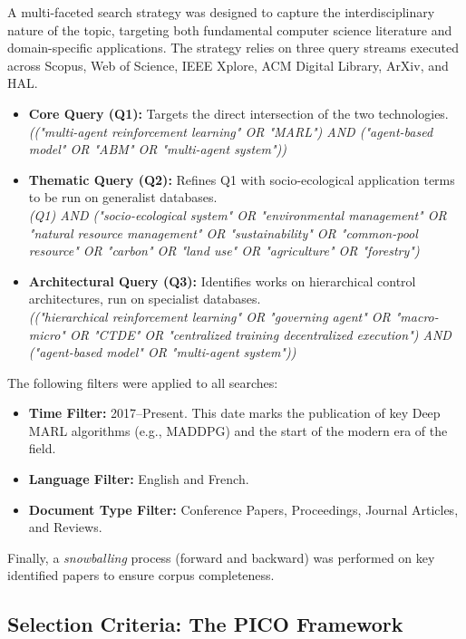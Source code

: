\documentclass[conference]{IEEEtran}
\begin{document}
A multi-faceted search strategy was designed to capture the interdisciplinary nature of the topic, targeting both fundamental computer science literature and domain-specific applications. The strategy relies on three query streams executed across Scopus, Web of Science, IEEE Xplore, ACM Digital Library, ArXiv, and HAL.

\begin{itemize}
    \item \textbf{Core Query (Q1):} Targets the direct intersection of the two technologies. \\
    \textit{(("multi-agent reinforcement learning" OR "MARL") AND ("agent-based model" OR "ABM" OR "multi-agent system"))}

    \item \textbf{Thematic Query (Q2):} Refines Q1 with socio-ecological application terms to be run on generalist databases. \\
    \textit{(Q1) AND ("socio-ecological system" OR "environmental management" OR "natural resource management" OR "sustainability" OR "common-pool resource" OR "carbon" OR "land use" OR "agriculture" OR "forestry")}

    \item \textbf{Architectural Query (Q3):} Identifies works on hierarchical control architectures, run on specialist databases. \\
    \textit{(("hierarchical reinforcement learning" OR "governing agent" OR "macro-micro" OR "CTDE" OR "centralized training decentralized execution") AND ("agent-based model" OR "multi-agent system"))}
\end{itemize}

The following filters were applied to all searches:
\begin{itemize}
    \item \textbf{Time Filter:} 2017--Present. This date marks the publication of key Deep MARL algorithms (e.g., MADDPG) and the start of the modern era of the field.
    \item \textbf{Language Filter:} English and French.
    \item \textbf{Document Type Filter:} Conference Papers, Proceedings, Journal Articles, and Reviews.
\end{itemize}

Finally, a \textit{snowballing} process (forward and backward) was performed on key identified papers to ensure corpus completeness.

\subsection{Selection Criteria: The PICO Framework}
\end{document}
